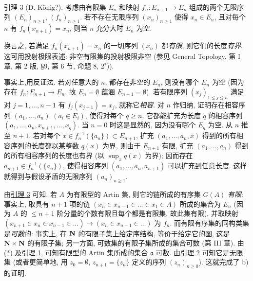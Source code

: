 

\hypertarget{sga4.exp.I.appendix.II.sec.6.lemma.3}{}
\begin{enonce*}{引理 3}
{\rm (D. K\"onig?)}. 考虑由有限集 $E_n$ 和映射 $f_n:E_{n+1}\rightarrow E_n$ 组成的两个无限序列 $(E_n)_{n\geq1}$, $(f_n)_{n\geq1}$. 若不存在无限序列 $(x_n)_{n%
\geq1}$ 使得 $x_n\in E_n$, 且对每个 $n$ 有 $f_n(x_{n+1})=x_n$, 则当 $n$ 充分大时 $E_n$ 为空.
\end{enonce*}

换言之, 若满足 $f_n(x_{n+1})=x_n$ 的一切序列 $(x_n)$ 都\emph{有限}, 则它们的长度\emph{有界}. 这可用投射极限表述: 非空有限集的投射极限非空 (参见 General Topology, 第 I 章, 第 2 版, \S 9, 第 6 节, 命题 8, $2^{\circ}$)).

事实上,\pageoriginale 用反证法. 若对任意大的 $n$, 都存在非空的 $E_n$, 则没有哪个 $E_n$ 为空 (因为存在 $f_n:E_{n+1}\rightarrow E_n$, 故 $E_n=∅$ 蕴涵 $E_{n+1}=∅$). 若有限序列 $(x_j)_{1\leq j\leq n}$ 满足对 $j=1,\ldots,n-1$ 有 $f_j(x_{j+1})=x_j$, 就称它\emph{相容}. 对 $n$ 作归纳, 证明存在相容序列 $(a_1,\ldots,a_n)$ $(a_i\in E_i)$, 使得对每个 $q\geq n$, 它都能扩充为长度 $q$ 的相容序列 $(a_1,\ldots,a_n,x_{n+1},\ldots,x_q)$. 当 $n=0$ 时这是显然的, 因为没有哪个 $E_q$ 为空. 从 $n$ 推至 $n+1$. 若对每个 $x\in f_n^{-1}(\{a_n\})\subset E_{n+1}$, 扩充 $(a_1,\ldots,a_n,x)$ 得到的所有相容序列的长度都以某整数 $q(x)$ 为界, 则由于 $E_{n+1}$ 有限, 扩充 $(a_1,\ldots,a_n)$ 得到的所有相容序列的长度也有界 (以 $\sup_xq(x)$ 为界); 因而存在 $a_{n+1}\in f_n^{-1}(\{a_n\})$, 使得相容序列 $(a_1,\ldots,a_n,a_{n+1})$ 可以扩充到任意长度. 这样就得到与假设矛盾的无限序列 $(a_n)_{n%
\geq1}$.

由\hyperlink{sga4.exp.I.appendix.II.sec.6.lemma.3}{引理 3} 可知, 若 $A$ 为有限型的 Artin 集, 则它的链所成的有序集 $G(A)$ \emph{有限}: 事实上, 取具有 $n+1$ 项的链 $(x_n\in x_{n-1}\in\ldots\in x_1\in A)$ 所成的集合为 $E_n$ (因为 $A$ 的 $\leq n+1$ 阶分量的个数有限且每个都是有限集, 故此集有限), 并取映射 $(x_{n+1}\in x_n\in x_{n-1}\in\ldots)\mapsto(x_n\in x_{n-1}\in\ldots)$ 为 $f_n$. 而有限\pageoriginale 有序集的同构类集是\emph{可数}的: 事实上, 在 $\mathbf{N}$ 的有限子集上给定序结构, 等价于给定它的图, 这是 $\mathbf{N}\times\mathbf{N}$ 的有限子集; 另一方面, 可数集的有限子集所成的集合可数 (第 III 章). 由 \hyperlink{sga4.exp.I.appendix.II.sec.6.theorem.2.proof.claim.star}{(*)} 及\hyperlink{sga4.exp.I.appendix.II.sec.6.lemma.1}{引理 1}, 可知有限型的 Artin 集所成的集合 $\mathfrak{a}$ 可数. 由\hyperlink{sga4.exp.I.appendix.II.sec.6.lemma.2}{引理 2} 可知它是无限集 (或者更简单地, 用 $z_0=∅$, $z_{n+1}=\{z_n\}$ 定义的序列 $(z_n)_{n\geq0}$). 这就完成了 b) 的证明.

